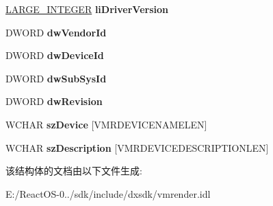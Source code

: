 \begin{DoxyCompactItemize}
\hyperlink{union___l_a_r_g_e___i_n_t_e_g_e_r}{L\+A\+R\+G\+E\+\_\+\+I\+N\+T\+E\+G\+ER} {\bfseries li\+Driver\+Version}
\item 
\mbox{\label{structtag_v_m_r_m_o_n_i_t_o_r_i_n_f_o_ace4a6fca21ec70fe9dae15fe1ac9870c}} 
D\+W\+O\+RD {\bfseries dw\+Vendor\+Id}
\item 
\mbox{\label{structtag_v_m_r_m_o_n_i_t_o_r_i_n_f_o_ab6024e86c9fa922e5920da6569e9dc2a}} 
D\+W\+O\+RD {\bfseries dw\+Device\+Id}
\item 
\mbox{\label{structtag_v_m_r_m_o_n_i_t_o_r_i_n_f_o_aca4c0e03976b3c1b56a7d8324d17cdda}} 
D\+W\+O\+RD {\bfseries dw\+Sub\+Sys\+Id}
\item 
\mbox{\label{structtag_v_m_r_m_o_n_i_t_o_r_i_n_f_o_a4ba269cf89fdd9e525f73f98a2ab64fc}} 
D\+W\+O\+RD {\bfseries dw\+Revision}
\item 
\mbox{\label{structtag_v_m_r_m_o_n_i_t_o_r_i_n_f_o_a7cfcfe3e57c6c81ef935108b56960b5d}} 
W\+C\+H\+AR {\bfseries sz\+Device} \mbox{[}V\+M\+R\+D\+E\+V\+I\+C\+E\+N\+A\+M\+E\+L\+EN\mbox{]}
\item 
\mbox{\label{structtag_v_m_r_m_o_n_i_t_o_r_i_n_f_o_a62591e940e88d76f2ae3ff86d2390083}} 
W\+C\+H\+AR {\bfseries sz\+Description} \mbox{[}V\+M\+R\+D\+E\+V\+I\+C\+E\+D\+E\+S\+C\+R\+I\+P\+T\+I\+O\+N\+L\+EN\mbox{]}
\end{DoxyCompactItemize}


该结构体的文档由以下文件生成\+:\begin{DoxyCompactItemize}
\item 
E\+:/\+React\+O\+S-\/0../sdk/include/dxsdk/vmrender.\+idl\end{DoxyCompactItemize}
